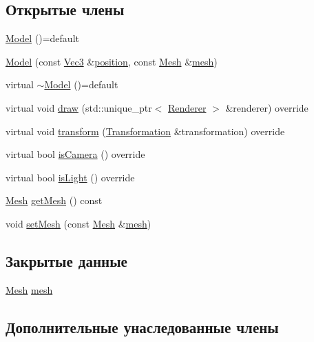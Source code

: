 \subsection*{Открытые члены}
\begin{DoxyCompactItemize}
\item 
\hyperlink{class_model_ab5bdabea36b1d1bee80151e2da913373}{Model} ()=default
\item 
\hyperlink{class_model_a8dcd35d49dd569537d6f62ee61ade330}{Model} (const \hyperlink{vec3_8h_a221ad8ea4d9be4111628ee1ca22ee3ba}{Vec3} \&\hyperlink{class_scene_object_af190cdf9b9449f96f73d836848ce4ad3}{position}, const \hyperlink{class_mesh}{Mesh} \&\hyperlink{class_model_a3d4bb8dadc8b8fa5513cd052ccc2276e}{mesh})
\item 
virtual \hyperlink{class_model_a2efbe4ec768191fa70ad86f260ec2fd6}{$\sim$\+Model} ()=default
\item 
virtual void \hyperlink{class_model_a09879231a804bbc347d6549a5b1ad495}{draw} (std\+::unique\+\_\+ptr$<$ \hyperlink{class_renderer}{Renderer} $>$ \&renderer) override
\item 
virtual void \hyperlink{class_model_a0bb5ca842ec53af3dde6918a04eecbca}{transform} (\hyperlink{class_transformation}{Transformation} \&transformation) override
\item 
virtual bool \hyperlink{class_model_a48eee23fb4c5246630fd97e21589f620}{is\+Camera} () override
\item 
virtual bool \hyperlink{class_model_a362e8e14db5f0d90cb44759bdad96e13}{is\+Light} () override
\item 
\hyperlink{class_mesh}{Mesh} \hyperlink{class_model_a38ca1ac30254bbf656b44c4dbac46474}{get\+Mesh} () const 
\item 
void \hyperlink{class_model_a9b279076425cc5296ee501cb28e343ea}{set\+Mesh} (const \hyperlink{class_mesh}{Mesh} \&\hyperlink{class_model_a3d4bb8dadc8b8fa5513cd052ccc2276e}{mesh})
\end{DoxyCompactItemize}
\subsection*{Закрытые данные}
\begin{DoxyCompactItemize}
\item 
\hyperlink{class_mesh}{Mesh} \hyperlink{class_model_a3d4bb8dadc8b8fa5513cd052ccc2276e}{mesh}
\end{DoxyCompactItemize}
\subsection*{Дополнительные унаследованные члены}


